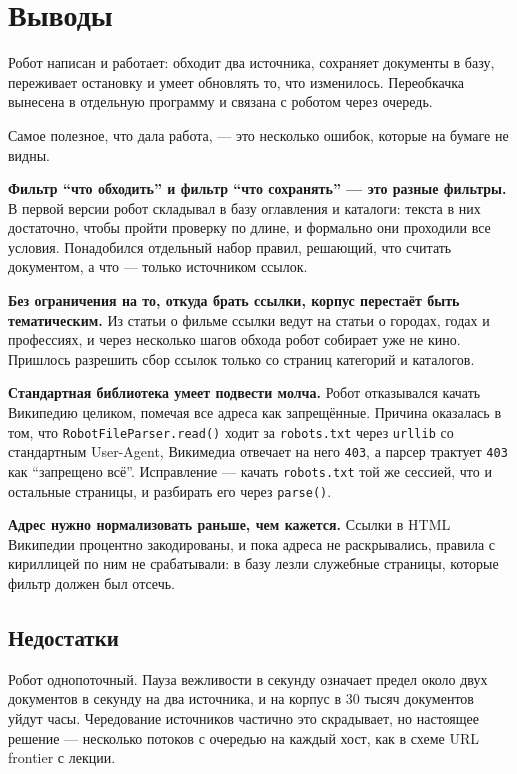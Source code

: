 \section{Выводы}

Робот написан и работает: обходит два источника, сохраняет документы в базу,
переживает остановку и умеет обновлять то, что изменилось. Переобкачка вынесена
в отдельную программу и связана с роботом через очередь.

Самое полезное, что дала работа, --- это несколько ошибок, которые на бумаге не
видны.

\textbf{Фильтр \enquote{что обходить} и фильтр \enquote{что сохранять} --- это
разные фильтры.} В первой версии робот складывал в базу оглавления и каталоги:
текста в них достаточно, чтобы пройти проверку по длине, и формально они
проходили все условия. Понадобился отдельный набор правил, решающий, что
считать документом, а что --- только источником ссылок.

\textbf{Без ограничения на то, откуда брать ссылки, корпус перестаёт быть
тематическим.} Из статьи о фильме ссылки ведут на статьи о городах, годах и
профессиях, и через несколько шагов обхода робот собирает уже не кино. Пришлось
разрешить сбор ссылок только со страниц категорий и каталогов.

\textbf{Стандартная библиотека умеет подвести молча.} Робот отказывался качать
Википедию целиком, помечая все адреса как запрещённые. Причина оказалась в том,
что \texttt{RobotFileParser.read()} ходит за \texttt{robots.txt} через
\texttt{urllib} со стандартным User-Agent, Викимедиа отвечает на него
\texttt{403}, а парсер трактует \texttt{403} как \enquote{запрещено всё}.
Исправление --- качать \texttt{robots.txt} той же сессией, что и остальные
страницы, и разбирать его через \texttt{parse()}.

\textbf{Адрес нужно нормализовать раньше, чем кажется.} Ссылки в HTML Википедии
процентно закодированы, и пока адреса не раскрывались, правила с кириллицей по
ним не срабатывали: в базу лезли служебные страницы, которые фильтр должен был
отсечь.

\subsection*{Недостатки}

Робот однопоточный. Пауза вежливости в секунду означает предел около двух
документов в секунду на два источника, и на корпус в 30 тысяч документов уйдут
часы. Чередование источников частично это скрадывает, но настоящее решение ---
несколько потоков с очередью на каждый хост, как в схеме URL frontier с лекции.


